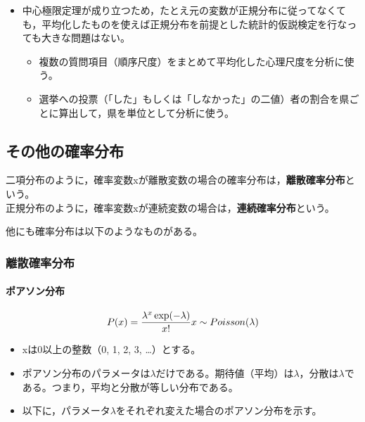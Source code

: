 \documentclass[]{article}
\providecommand{\tightlist}{%
  \setlength{\itemsep}{0pt}\setlength{\parskip}{0pt}}
\let\oldparagraph\paragraph
\renewcommand{\paragraph}[1]{\oldparagraph{#1}\mbox{}}
\begin{document}
\begin{itemize}
\tightlist
\item
  中心極限定理が成り立つため，たとえ元の変数が正規分布に従ってなくても，平均化したものを使えば正規分布を前提とした統計的仮説検定を行なっても大きな問題はない。

  \begin{itemize}
  \tightlist
  \item
    複数の質問項目（順序尺度）をまとめて平均化した心理尺度を分析に使う。
  \item
    選挙への投票（「した」もしくは「しなかった」の二値）者の割合を県ごとに算出して，県を単位として分析に使う。
  \end{itemize}
\end{itemize}

\subsection{その他の確率分布}

二項分布のように，確率変数xが離散変数の場合の確率分布は，\textbf{離散確率分布}という。\\
正規分布のように，確率変数xが連続変数の場合は，\textbf{連続確率分布}という。

他にも確率分布は以下のようなものがある。

\subsubsection{離散確率分布}

\paragraph{ポアソン分布}

\[
P(x) = \frac{\lambda^x\exp(-\lambda)}{x!}\\
x \sim Poisson(\lambda)\\
\]

\begin{itemize}
\tightlist
\item
  xは0以上の整数（0, 1, 2, 3, \ldots{}）とする。\\
\item
  ポアソン分布のパラメータは\(\lambda\)だけである。期待値（平均）は\(\lambda\)，分散は\(\lambda\)である。つまり，平均と分散が等しい分布である。
\item
  以下に，パラメータ\(\lambda\)をそれぞれ変えた場合のポアソン分布を示す。
\end{itemize}
\end{document}

